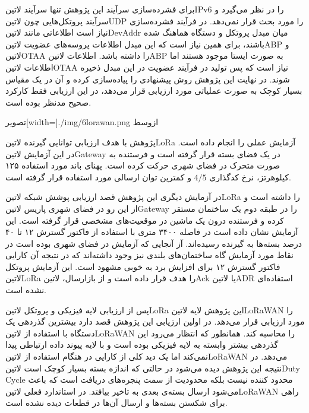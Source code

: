 برای فشرده‌سازی سرآیند این پژوهش تنها سرآیند ‌لاتین{IPv6} را در نظر می‌گیرد و سرآیند پروتکل‌هایی چون ‌لاتین{UDP} را مورد بحث قرار نمی‌دهد.
در فرآیند فشرده‌سازی نیاز است اطلاعاتی مانند ‌لاتین{DevAddr} میان مبدل پروتکل و دستگاه هماهنگ شده باشند، برای همین نیاز است که این مبدل اطلاعات پروسه‌های عضویت ‌لاتین{ABP} و ‌لاتین{OTAA}
را داشته باشد. اطلاعات ‌لاتین{ABP} به صورت ایستا موجود هستند اما اطلاعات ‌لاتین{OTAA} نیاز است که پس تولید در فرآیند عضویت در این مبدل ذخیره شوند.
در نهایت این پژوهش روش پیشنهادی را پیاده‌سازی کرده و آن در یک مقیاس بسیار کوچک به صورت عملیاتی مورد ارزیابی قرار می‌دهد، در این ارزیابی فقط کارکرد صحیح مدنظر بوده است.

‌تصویر[width=\textwidth]{./img/6lorawan.png}
‌ازوسط


پژوهش  با هدف ارزیابی توانایی گیرنده ‌لاتین{LoRa} آزمایش عملی را انجام داده است. در این آزمایش ‌لاتین{Gateway} در یک فضای بسته قرار گرفته است و فرستنده
به صورت متحرک در فضای شهری حرکت کرده است. پهنای باند مورد استفاده ۱۲۵ کیلوهرتز، نرخ کدگذاری $4/5$ و کمترین توان ارسالی مورد استفاده قرار گرفته است.

در آزمایش دیگری این پژوهش قصد ارزیابی پوشش شبکه ‌لاتین{LoRa} را داشته است و از این رو در فضای شهری پاریس ‌لاتین{Gateway} را در طبقه دوم یک ساختمان مستقر کرده و فرستنده
درون یک ماشین در موقعیت‌های مشخصی قرار گرفته است. این آزمایش نشان داده است در فاصله ۳۴۰۰ متری با استفاده از فاکتور گسترش ۱۲ تا ۴۰ درصد بسته‌ها به گیرنده رسیده‌اند.
آز آنجایی که آزمایش در فضای شهری بوده است در نقاط مورد آزمایش گاه ساختمان‌های بلندی نیز وجود داشته‌اند که در نتیجه آن کارایی فاکتور گسترش ۱۲ برای افزایش برد به خوبی مشهود است.
این آزمایش پروتکل ‌لاتین{LoRa} را هدف قرار داده است و از بازارسال، ‌لاتین{Ack} یا ‌لاتین{ADR} استفاده‌ای نشده است.

پس از ارزیابی لایه فیزیکی و پروتکل ‌لاتین{LoRa} این پژوهش لایه ‌لاتین{LoRaWAN} را مورد ارزیابی قرار می‌دهد. در اولین ارزیابی این پژوهش قصد دارد بیشترین گذردهی یک دستگاه
با استفاده از ‌لاتین{LoRaWAN} را محاسبه کند. همانطور که انتظار می‌رود این گذردهی بیشتر وابسته به لایه فیزیکی بوده است و با لایه پیوند داده ارتباطی پیدا نمی‌کند اما یک دید کلی از
کارایی در هنگام استفاده از ‌لاتین{LoRaWAN} می‌دهد. در نتیجه این پژوهش دیده می‌شود در حالتی که اندازه بسته بسیار کوچک است ‌لاتین{Duty Cycle} محدود کننده نیست بلکه
محدودیت از سمت پنجره‌های دریافت است که باعث می‌شود ارسال بسته‌ی بعدی به تاخیر بیافتد. در استاندارد فعلی ‌لاتین{LoRaWAN} راهی برای شکستن بسته‌ها و ارسال آن‌ها در قطعات دیده نشده است.

